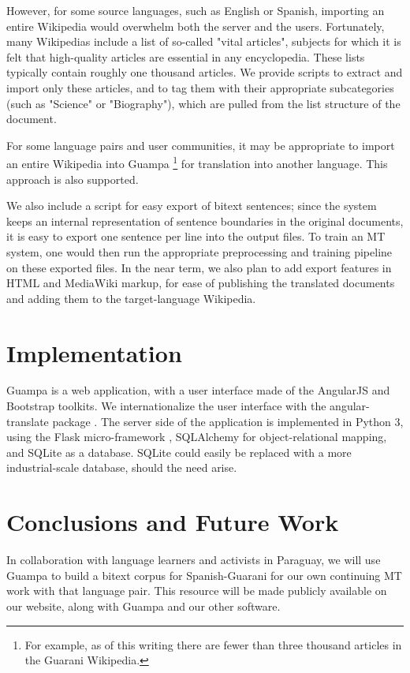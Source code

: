 \documentclass[10pt, a4paper]{article}
\begin{document}
However, for some source languages, such as English or Spanish, importing an
entire Wikipedia would overwhelm both the server and the users. Fortunately,
many Wikipedias include a list of so-called "vital articles", subjects for
which it is felt that high-quality articles are essential in any encyclopedia.
These lists typically contain roughly one thousand articles. We provide scripts
to extract and import only these articles, and to tag them with their
appropriate subcategories (such as "Science" or "Biography"), which are pulled
from the list structure of the document.

For some language pairs and user communities, it may be appropriate to import
an entire Wikipedia into Guampa \footnote{For example, as of this writing there are fewer than three thousand articles in the Guarani Wikipedia.} for
translation into another language. This approach is also supported.

We also include a script for easy export of bitext sentences; since the system
keeps an internal representation of sentence boundaries in the original
documents, it is easy to export one sentence per line into the output files. To
train an MT system, one would then run the appropriate preprocessing and
training pipeline on these exported files. In the near term, we also plan to
add export features in HTML and MediaWiki markup, for ease of publishing the
translated documents and adding them to the target-language Wikipedia.


\section{Implementation}
Guampa is a web application, with a user interface made of the AngularJS
\cite{angularjs} and Bootstrap \cite{bootstrap} toolkits. We internationalize
the user interface with the angular-translate package \cite{angular-translate}.
The server side of the application is implemented in Python 3, using the Flask
micro-framework \cite{flask}, SQLAlchemy
\cite{sqlalchemy} for object-relational mapping, and SQLite \cite{sqlite} as a
database. SQLite could easily be replaced with a more industrial-scale
database, should the need arise.

\section{Conclusions and Future Work}
In collaboration with language learners and activists in Paraguay, we will use
Guampa to build a bitext corpus for Spanish-Guarani for our own continuing MT
work with that language pair. This resource will be made publicly available on
our website, along with Guampa and our other software.
\end{document}
